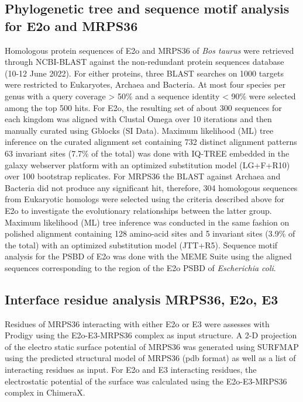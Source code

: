 \subsection*{Phylogenetic tree and sequence motif analysis for E2o and MRPS36}
Homologous protein sequences of E2o and MRPS36 of \emph{Bos taurus} were retrieved through NCBI-BLAST against the non-redundant protein sequences database (10-12 June 2022). For either proteins, three BLAST searches on 1000 targets were restricted to Eukaryotes, Archaea and Bacteria. At most four species per genus with a query coverage > 50\% and a sequence identity < 90\% were selected among the top 500 hits. For E2o, the resulting set of about 300 sequences for each kingdom was aligned with Clustal Omega \cite{Sievers_2018} over 10 iterations and then manually curated using Gblocks \cite{Talavera_2007} (SI Data). Maximum likelihood (ML) tree inference on the curated alignment set containing 732 distinct alignment patterns 63 invariant sites (7.7\% of the total)  was done with IQ-TREE \cite{Minh_2020} embedded in the galaxy webserver platform \cite{Afgan_2016} with an optimized substitution model (LG+F+R10) over 100 bootstrap replicates. For MRPS36 the BLAST against Archaea and Bacteria did not produce any significant hit, therefore, 304 homologous sequences from Eukaryotic homologs were selected using the criteria described above for E2o to investigate the evolutionary relationships between the latter group. Maximum likelihood (ML) tree inference  was conducted in the same fashion on polished alignment containing 128 amino-acid sites and 5 invariant sites (3.9\% of the total) with an optimized substitution model (JTT+R5). Sequence motif analysis for the PSBD of E2o was done with the MEME Suite \cite{Bailey_2015} using the aligned sequences corresponding to the region of the E2o PSBD of \emph{Escherichia coli}.
%
\subsection*{Interface residue analysis MRPS36, E2o, E3}
Residues of MRPS36 interacting with either E2o or E3 were assesses with Prodigy \cite{Vangone_2015} using the E2o-E3-MRPS36 complex as input structure. A 2-D projection of the electro static surface potential of MRPS36 was generated using SURFMAP \cite{Schweke_2022} using the predicted structural model of MRPS36 (pdb format) as well as a list of interacting residues as input. For E2o and E3 interacting residues, the electrostatic potential of the surface was calculated using the E2o-E3-MRPS36 complex in ChimeraX.
%

